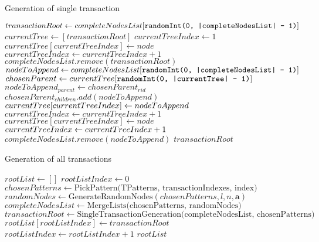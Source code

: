 \documentclass{acm_proc_article-sp-sigmod09}
\begin{document}
\begin{algorithm}
\caption{Generation of single transaction}
\label{transaction_generation}
\begin{algorithmic}[1]
\State $transactionRoot \gets complete\-Nodes\-List[\texttt{randomInt(0, |completeNodesList| - 1)}]$
\State $currentTree \gets [transactionRoot]$
\State $currentTreeIndex \gets 1$
        \State $currentTree[currentTreeIndex] \gets node$
        \State $currentTreeIndex \gets currentTreeIndex + 1$
    \EndFor
\EndIf
\State $completeNodesList.remove(transactionRoot)$
    \State $nodeToAppend \gets complete\-Nodes\-List[\texttt{randomInt(0, |completeNodesList| - 1)}]$
    \State $chosenParent \gets current\-Tree[\texttt{randomInt(0, |currentTree| - 1)}]$
    \State $nodeToAppend_{parent} \gets chosenParent_{rid}$
    \State $chosenParent_{children}.add(nodeToAppend)$
    \State $currentTree[currentTreeIndex] \gets node\-To\-Append$
    \State $currentTreeIndex \gets currentTreeIndex + 1$
            \State $currentTree[currentTreeIndex] \gets node$
            \State $currentTreeIndex \gets current\-Tree\-Index + 1$
        \EndFor
    \EndIf
    \State $completeNodesList.remove(nodeToAppend)$
\EndFor
\Return $transactionRoot$
\EndFunction
\end{algorithmic}
\end{algorithm}

\begin{algorithm}
\caption{Generation of all transactions}
\label{complete_transaction_generation}
\begin{algorithmic}[1]
\State $rootList \gets []$
\State $rootListIndex \gets 0$
    \State $chosenPatterns \gets \text{PickPattern(TPatterns, transactionIndexes, index)}$
    \State $randomNodes \gets \text{GenerateRandomNodes}(chosenPatterns, l, n, \boldsymbol{a})$
    \State $completeNodesList \gets \text{MergeLists(chosenPatterns, randomNodes)}$
    \State $transactionRoot \gets \text{SingleTransactionGeneration(completeNodesList, chosenPatterns)}$
    \State $rootList[rootListIndex] \gets transactionRoot$
    \State $rootListIndex \gets rootListIndex + 1$
\EndFor
\Return $rootList$
\EndFunction
\end{algorithmic}
\end{algorithm}
\end{document}

